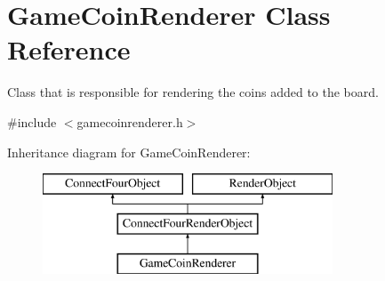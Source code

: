 \hypertarget{class_game_coin_renderer}{\section{Game\-Coin\-Renderer Class Reference}
\label{class_game_coin_renderer}
}


Class that is responsible for rendering the coins added to the board.  




{\ttfamily \#include $<$gamecoinrenderer.\-h$>$}

Inheritance diagram for Game\-Coin\-Renderer\-:\begin{figure}[H]
\begin{center}
\leavevmode
\includegraphics[height=3.000000cm]{class_game_coin_renderer}
\end{center}
\end{figure}
